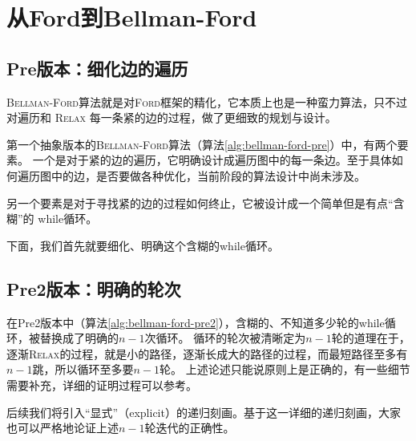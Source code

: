\section{从Ford到Bellman-Ford}

\subsection{Pre版本：细化边的遍历}

\textsc{Bellman-Ford}算法就是对\textsc{Ford}框架的精化，它本质上也是一种蛮力算法，只不过对遍历和 \textsc{Relax} 每一条紧的边的过程，做了更细致的规划与设计。

第一个抽象版本的\textsc{Bellman-Ford}算法（算法\ref{alg:bellman-ford-pre}）中，有两个要素。
一个是对于紧的边的遍历，它明确设计成遍历图中的每一条边。至于具体如何遍历图中的边，是否要做各种优化，当前阶段的算法设计中尚未涉及。

另一个要素是对于寻找紧的边的过程如何终止，它被设计成一个简单但是有点“含糊”的 while循环。

下面，我们首先就要细化、明确这个含糊的while循环。

\begin{algorithm}[htbp]
    \caption{($s$)}
    \label{alg:bellman-ford-pre}
    \begin{algorithmic}[1]
        \State {}
                    \State {}
                \EndIf
            \EndFor
        \EndWhile
    \end{algorithmic}
\end{algorithm}

\subsection{Pre2版本：明确的轮次}

在Pre2版本中（算法\ref{alg:bellman-ford-pre2}），含糊的、不知道多少轮的while循环，被替换成了明确的$n-1$次循环。
循环的轮次被清晰定为$n-1$轮的道理在于，逐渐\textsc{Relax}的过程，就是小的路径，逐渐长成大的路径的过程，而最短路径至多有$n-1$跳，所以循环至多要$n-1$轮。
上述论述只能说原则上是正确的，有一些细节需要补充，详细的证明过程可以参考\cite{Erickson19}。

后续我们将引入“显式”（explicit）的递归刻画。基于这一详细的递归刻画，大家也可以严格地论证上述$n-1$轮迭代的正确性。

